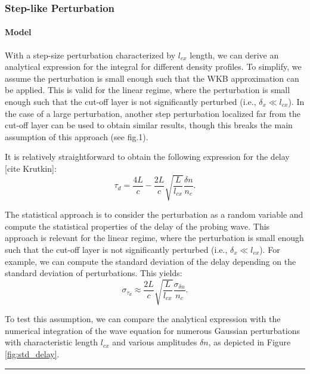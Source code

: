 \documentclass[11pt,openany]{report}
\begin{document}
\begin{multicols}{2}
    \subsubsection{Step-like Perturbation}
    \paragraph*{Model}
    With a step-size perturbation characterized by $l_{cx}$ length, we can derive an analytical expression for the integral for different density profiles. To simplify, we assume the perturbation is small enough such that the WKB approximation can be applied. This is valid for the linear regime, where the perturbation is small enough such that the cut-off layer is not significantly perturbed (i.e., $\delta_x \ll l_{cx}$). In the case of a large perturbation, another step perturbation localized far from the cut-off layer can be used to obtain similar results, though this breaks the main assumption of this approach (see fig.1).

    It is relatively straightforward to obtain the following expression for the delay [cite Krutkin]:
    $$\tau_d = \frac{4L}{c} - \frac{2L}{c} \sqrt{\frac{L}{l_{cx}}} \frac{\delta n}{n_c}.$$

    The statistical approach is to consider the perturbation as a random variable and compute the statistical properties of the delay of the probing wave. This approach is relevant for the linear regime, where the perturbation is small enough such that the cut-off layer is not significantly perturbed (i.e., $\delta_x \ll l_{cx}$). For example, we can compute the standard deviation of the delay depending on the standard deviation of perturbations. This yields:
    $$\sigma_{\tau_d} \approx \frac{2L}{c} \sqrt{\frac{L}{l_{cx}}} \frac{\sigma_{\delta n}}{n_c}.$$

    To test this assumption, we can compare the analytical expression with the numerical integration of the wave equation for numerous Gaussian perturbations with characteristic length $l_{cx}$ and various amplitudes $\delta n$, as depicted in Figure \ref{fig:std_delay}.
\end{multicols}
\noindent
\rule{\linewidth}{0.4pt}
\end{document}
